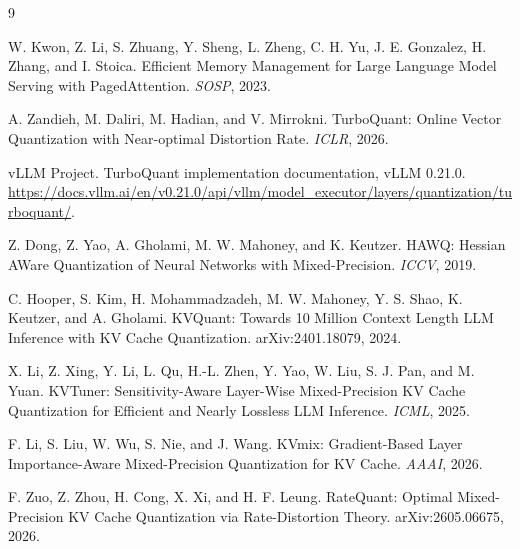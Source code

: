 \documentclass[10pt]{article}
\begin{document}
\begin{thebibliography}{9}
\small

W. Kwon, Z. Li, S. Zhuang, Y. Sheng, L. Zheng, C. H. Yu, J. E. Gonzalez, H. Zhang, and I. Stoica.
\newblock Efficient Memory Management for Large Language Model Serving with PagedAttention.
\newblock \emph{SOSP}, 2023.

A. Zandieh, M. Daliri, M. Hadian, and V. Mirrokni.
\newblock TurboQuant: Online Vector Quantization with Near-optimal Distortion Rate.
\newblock \emph{ICLR}, 2026.

vLLM Project.
\newblock TurboQuant implementation documentation, vLLM 0.21.0.
\newblock \url{https://docs.vllm.ai/en/v0.21.0/api/vllm/model_executor/layers/quantization/turboquant/}.

Z. Dong, Z. Yao, A. Gholami, M. W. Mahoney, and K. Keutzer.
\newblock HAWQ: Hessian AWare Quantization of Neural Networks with Mixed-Precision.
\newblock \emph{ICCV}, 2019.

C. Hooper, S. Kim, H. Mohammadzadeh, M. W. Mahoney, Y. S. Shao, K. Keutzer, and A. Gholami.
\newblock KVQuant: Towards 10 Million Context Length LLM Inference with KV Cache Quantization.
\newblock arXiv:2401.18079, 2024.

X. Li, Z. Xing, Y. Li, L. Qu, H.-L. Zhen, Y. Yao, W. Liu, S. J. Pan, and M. Yuan.
\newblock KVTuner: Sensitivity-Aware Layer-Wise Mixed-Precision KV Cache Quantization for Efficient and Nearly Lossless LLM Inference.
\newblock \emph{ICML}, 2025.

F. Li, S. Liu, W. Wu, S. Nie, and J. Wang.
\newblock KVmix: Gradient-Based Layer Importance-Aware Mixed-Precision Quantization for KV Cache.
\newblock \emph{AAAI}, 2026.

F. Zuo, Z. Zhou, H. Cong, X. Xi, and H. F. Leung.
\newblock RateQuant: Optimal Mixed-Precision KV Cache Quantization via Rate-Distortion Theory.
\newblock arXiv:2605.06675, 2026.

\end{thebibliography}
\end{document}
